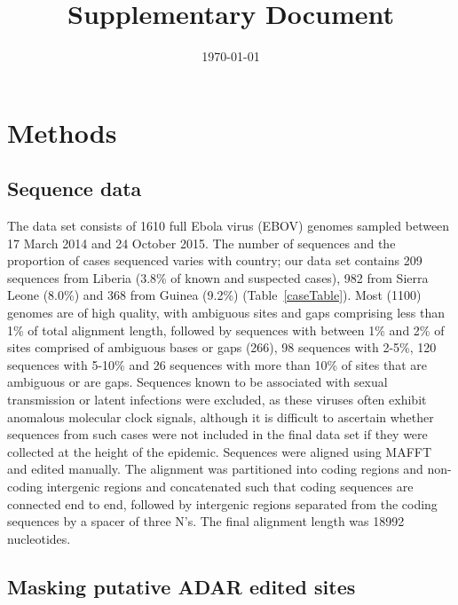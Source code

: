 \documentclass[11pt,oneside,letterpaper]{article}
\title{\vspace{1.0cm} \LARGE \bf Supplementary Document}
\date{\today}
\begin{document}
\maketitle

\begin{abstract}


\end{abstract}

\pagebreak

\section*{Methods}

\subsection*{Sequence data}

The data set consists of 1610 full Ebola virus (EBOV) genomes sampled between 17 March 2014 and 24 October 2015. 
The number of sequences and the proportion of cases sequenced varies with country; our data set contains 209 sequences from Liberia (3.8\% of known and suspected cases), 982 from Sierra Leone (8.0\%) and 368 from Guinea (9.2\%) (Table~\ref{caseTable}).
Most (1100) genomes are of high quality, with ambiguous sites and gaps comprising less than 1\% of total alignment length, followed by sequences with between 1\% and 2\% of sites comprised of ambiguous bases or gaps (266), 98 sequences with 2-5\%, 120 sequences with 5-10\% and 26 sequences with more than 10\% of sites that are ambiguous or are gaps.
Sequences known to be associated with sexual transmission or latent infections were excluded, as these viruses often exhibit anomalous molecular clock signals, although it is difficult to ascertain whether sequences from such cases were not included in the final data set if they were collected at the height of the epidemic.
Sequences were aligned using MAFFT \citep{katoh_2002} and edited manually.
The alignment was partitioned into coding regions and non-coding intergenic regions and concatenated such that coding sequences are connected end to end, followed by intergenic regions separated from the coding sequences by a spacer of three N's.
The final alignment length was 18992 nucleotides.
 
\subsection*{Masking putative ADAR edited sites}
\end{document}
